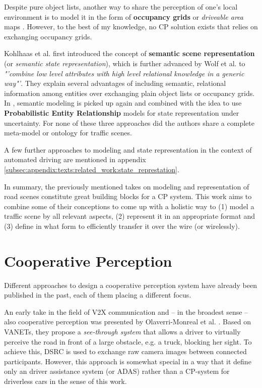 Despite pure object lists, another way to share the perception of one's local environment is to model it in the form of \textbf{occupancy grids} or \textit{driveable area} maps \cite{pieringermodellierung}. However, to the best of my knowledge, no CP solution exists that relies on exchanging occupancy grids.

Kohlhaas et al. \cite{Kohlhaas2014} first introduced the concept of \textbf{semantic scene representation} (or \textit{semantic state representation}), which is further advanced by Wolf et al. \cite{Wolf2018} to \textit{"'combine low level attributes with high level relational knowledge in a generic way"'}. They explain several advantages of including semantic, relational information among entities over exchanging plain object lists or occupancy grids. In \cite{Petrich2018}, semantic modeling is picked up again and combined with the idea to use \textbf{Probabilistic Entity Relationship} models for state representation under uncertainty. For none of these three approaches did the authors share a complete meta-model or ontology for traffic scenes.

A few further approaches to modeling and state representation in the context of automated driving are mentioned in appendix \cref{subsec:appendix:texts:related_work:state_represtation}.
\par
\bigskip

In summary, the previously mentioned takes on modeling and representation of road scenes constitute great building blocks for a CP system. This work aims to combine some of their conceptions to come up with a holistic way to (1) model a traffic scene by all relevant aspects, (2) represent it in an appropriate format and (3) define in what form to efficiently transfer it over the wire (or wirelessly). 

\section{Cooperative Perception}
\label{sec:related_work:cooperative_perception}
Different approaches to design a cooperative perception system have already been published in the past, each of them placing a different focus.
\par
\bigskip

An early take in the field of V2X communication and – in the broadest sense – also cooperative perception was presented by Olaverri-Monreal et al. \cite{Olaverri-Monreal2010}. Based on VANETs, they propose a \textit{see-through system} that allows a driver to virtually perceive the road in front of a large obstacle, e.g. a truck, blocking her sight. To achieve this, DSRC is used to exchange raw camera images between connected participants. However, this approach is somewhat special in a way that it define only an driver assistance system (or ADAS) rather than a CP-system for driverless cars in the sense of this work.
\par
\bigskip

